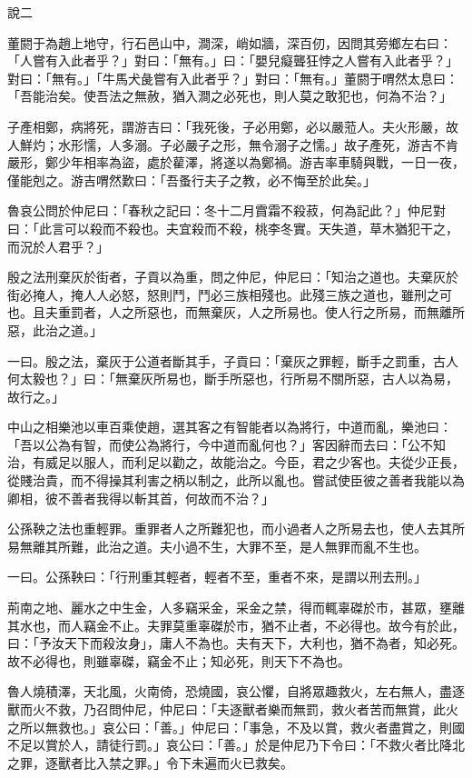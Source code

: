 \begin{pinyinscope}
說二

董閼于為趙上地守，行石邑山中，澗深，峭如牆，深百仞，因問其旁鄉左右曰：「人嘗有入此者乎？」對曰：「無有。」曰：「嬰兒癡聾狂悖之人嘗有入此者乎？」對曰：「無有。」「牛馬犬彘嘗有入此者乎？」對曰：「無有。」董閼于喟然太息曰：「吾能治矣。使吾法之無赦，猶入澗之必死也，則人莫之敢犯也，何為不治？」

子產相鄭，病將死，謂游吉曰：「我死後，子必用鄭，必以嚴蒞人。夫火形嚴，故人鮮灼；水形懦，人多溺。子必嚴子之形，無令溺子之懦。」故子產死，游吉不肯嚴形，鄭少年相率為盜，處於雚澤，將遂以為鄭禍。游吉率車騎與戰，一日一夜，僅能剋之。游吉喟然歎曰：「吾蚤行夫子之教，必不悔至於此矣。」

魯哀公問於仲尼曰：「春秋之記曰：冬十二月霣霜不殺菽，何為記此？」仲尼對曰：「此言可以殺而不殺也。夫宜殺而不殺，桃李冬實。天失道，草木猶犯干之，而況於人君乎？」

殷之法刑棄灰於街者，子貢以為重，問之仲尼，仲尼曰：「知治之道也。夫棄灰於街必掩人，掩人人必怒，怒則鬥，鬥必三族相殘也。此殘三族之道也，雖刑之可也。且夫重罰者，人之所惡也，而無棄灰，人之所易也。使人行之所易，而無離所惡，此治之道。」

一曰。殷之法，棄灰于公道者斷其手，子貢曰：「棄灰之罪輕，斷手之罰重，古人何太毅也？」曰：「無棄灰所易也，斷手所惡也，行所易不關所惡，古人以為易，故行之。」

中山之相樂池以車百乘使趙，選其客之有智能者以為將行，中道而亂，樂池曰：「吾以公為有智，而使公為將行，今中道而亂何也？」客因辭而去曰：「公不知治，有威足以服人，而利足以勸之，故能治之。今臣，君之少客也。夫從少正長，從賤治貴，而不得操其利害之柄以制之，此所以亂也。嘗試使臣彼之善者我能以為卿相，彼不善者我得以斬其首，何故而不治？」

公孫鞅之法也重輕罪。重罪者人之所難犯也，而小過者人之所易去也，使人去其所易無離其所難，此治之道。夫小過不生，大罪不至，是人無罪而亂不生也。

一曰。公孫鞅曰：「行刑重其輕者，輕者不至，重者不來，是謂以刑去刑。」

荊南之地、麗水之中生金，人多竊采金，采金之禁，得而輒辜磔於市，甚眾，壅離其水也，而人竊金不止。夫罪莫重辜磔於市，猶不止者，不必得也。故今有於此，曰：「予汝天下而殺汝身」，庸人不為也。夫有天下，大利也，猶不為者，知必死。故不必得也，則雖辜磔，竊金不止；知必死，則天下不為也。

魯人燒積澤，天北風，火南倚，恐燒國，哀公懼，自將眾趣救火，左右無人，盡逐獸而火不救，乃召問仲尼，仲尼曰：「夫逐獸者樂而無罰，救火者苦而無賞，此火之所以無救也。」哀公曰：「善。」仲尼曰：「事急，不及以賞，救火者盡賞之，則國不足以賞於人，請徒行罰。」哀公曰：「善。」於是仲尼乃下令曰：「不救火者比降北之罪，逐獸者比入禁之罪。」令下未遍而火已救矣。


\end{pinyinscope}
